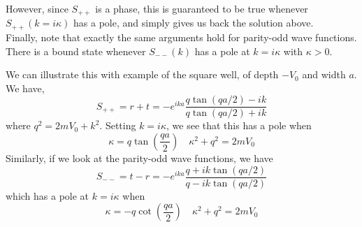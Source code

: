 However, since $S_{++}$ is a phase, this is guaranteed to be true whenever $S_{++}(k = i\kappa)$ has a pole, and simply gives us back the solution above.
\\
Finally, note that exactly the same arguments hold for parity-odd wave functions.
There is a bound state whenever $S_{--}(k)$ has a pole at $k = i\kappa$ with $\kappa > 0$.
\begin{example}
We can illustrate this with example of the square well, of depth $-V_0$ and width $a$.
We have,
\[S_{++} = r + t = -e^{ika} \frac{q\tan(qa/2)-ik}{q\tan(qa/2)+ik} \]
where $q^2 = 2mV_0 + k^2$. Setting $k = i\kappa$, we see that this has a pole when
\[\kappa = q\tan(\frac{qa}{2}) \quad \kappa^2 + q^2 = 2mV_0\] 
Similarly, if we look at the parity-odd wave functions, we have
\[S_{--} = t - r = -e^{ika} \frac{q+ik\tan(qa/2)}{q-ik\tan(qa/2)} \]
which has a pole at $k = i\kappa$ when
\[\kappa = -q\cot(\frac{qa}{2}) \quad \kappa^2 + q^2 = 2mV_0\]
\end{example}

